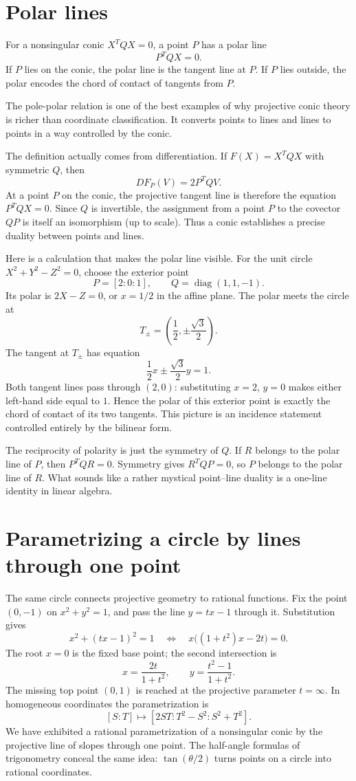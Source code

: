 \section{Polar lines}

For a nonsingular conic \(X^TQX=0\), a point \(P\) has a polar line
\[
  P^TQX=0.
\]
If \(P\) lies on the conic, the polar line is the tangent line at \(P\).  If \(P\) lies outside, the polar encodes the chord of contact of tangents from \(P\).

The pole-polar relation is one of the best examples of why projective conic theory is richer than coordinate classification.  It converts points to lines and lines to points in a way controlled by the conic.

The definition actually comes from differentiation. If $F(X)=X^TQX$ with symmetric $Q$, then
\[
 DF_P(V)=2P^TQV.
\]
At a point $P$ on the conic, the projective tangent line is therefore the equation $P^TQX=0$. Since $Q$ is invertible, the assignment from a point $P$ to the covector $QP$ is itself an isomorphism (up to scale). Thus a conic establishes a precise duality between points and lines.

Here is a calculation that makes the polar line visible. For the unit circle $X^2+Y^2-Z^2=0$, choose the exterior point
\[
 P=[2:0:1],\qquad Q=\operatorname{diag}(1,1,-1).
\]
Its polar is $2X-Z=0$, or $x=1/2$ in the affine plane. The polar meets the circle at
\[
 T_\pm=\left(\frac12,\pm\frac{\sqrt3}{2}\right).
\]
The tangent at $T_\pm$ has equation
\[
 \frac12 x\pm\frac{\sqrt3}{2}y=1.
\]
Both tangent lines pass through $(2,0)$: substituting $x=2$, $y=0$ makes either left-hand side equal to $1$. Hence the polar of this exterior point is exactly the chord of contact of its two tangents. This picture is an incidence statement controlled entirely by the bilinear form.

The reciprocity of polarity is just the symmetry of $Q$. If $R$ belongs to the polar line of $P$, then $P^TQR=0$. Symmetry gives $R^TQP=0$, so $P$ belongs to the polar line of $R$. What sounds like a rather mystical point--line duality is a one-line identity in linear algebra.

\section{Parametrizing a circle by lines through one point}

The same circle connects projective geometry to rational functions. Fix the point $(0,-1)$ on $x^2+y^2=1$, and pass the line $y=tx-1$ through it. Substitution gives
\[
 x^2+(tx-1)^2=1
 \quad\Longleftrightarrow\quad
 x\bigl((1+t^2)x-2t\bigr)=0.
\]
The root $x=0$ is the fixed base point; the second intersection is
\[
 \boxed{x=\frac{2t}{1+t^2},\qquad y=\frac{t^2-1}{1+t^2}.}
\]
The missing top point $(0,1)$ is reached at the projective parameter $t=\infty$. In homogeneous coordinates the parametrization is
\[
 [S:T]\longmapsto[2ST:T^2-S^2:S^2+T^2].
\]
We have exhibited a rational parametrization of a nonsingular conic by the projective line of slopes through one point. The half-angle formulas of trigonometry conceal the same idea: $\tan(\theta/2)$ turns points on a circle into rational coordinates.

